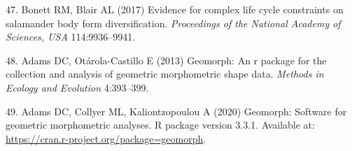 \documentclass[9pt,twocolumn,twoside,lineno]{pnas-new}
\begin{document}
\leavevmode\hypertarget{ref-Bonett2017}{}%
47. Bonett RM, Blair AL (2017) Evidence for complex life cycle
constraints on salamander body form diversification. \emph{Proceedings
of the National Academy of Sciences, USA} 114:9936--9941.

\leavevmode\hypertarget{ref-AdamsOtarola2013}{}%
48. Adams DC, Otárola-Castillo E (2013) Geomorph: An r package for the
collection and analysis of geometric morphometric shape data.
\emph{Methods in Ecology and Evolution} 4:393--399.

\leavevmode\hypertarget{ref-AdamsGeomorph}{}%
49. Adams DC, Collyer ML, Kaliontzopoulou A (2020) Geomorph: Software
for geometric morphometric analyses. R package version 3.3.1. Available
at: \url{https://cran.r-project.org/package=geomorph}.



% 
\end{document}

